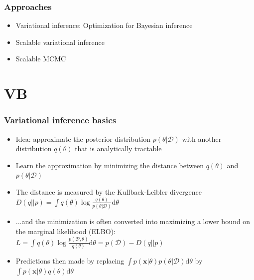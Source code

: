 \documentclass{beamer}
\newcommand{\dataset}{\mathcal{D}}
\newcommand{\parameters}{\theta}
\newcommand{\vx}{\mathbf{x}}
\newcommand{\diff}{\mathrm{d}}
\begin{document}
\begin{frame}
  \frametitle{Approaches}

  \begin{itemize}
    \item Variational inference: Optimization for Bayesian inference
    \item Scalable variational inference
    \item Scalable MCMC
  \end{itemize}
\end{frame}

\section{VB}


\begin{frame}
  \frametitle{Variational inference basics}

  \begin{itemize}
  \item Idea: approximate the posterior distribution $p(\parameters | \dataset)$
    with another distribution $q(\parameters)$ that is analytically tractable
  \item Learn the approximation by minimizing the distance between $q(\parameters)$ and $p(\parameters | \dataset)$
  \item The distance is measured by the Kullback-Leibler divergence
    $D(q||p) = \int q(\parameters) \log \frac{q(\parameters)}{p(\parameters| \dataset)}\diff \parameters$
  \item ...and the minimization is often converted into maximizing a lower bound on the marginal
    likelihood (ELBO):
    $L = \int q(\parameters) \log \frac{p(\dataset,\parameters)}{q(\parameters)} \diff \parameters= p(\dataset) - D(q||p)$
  \item Predictions then made by replacing $\int p(\vx|\parameters) p(\parameters | \dataset) \diff \parameters$ by
    $\int p(\vx|\parameters) q(\parameters) \diff \parameters$
  \end{itemize}
\end{frame}

\end{document}
